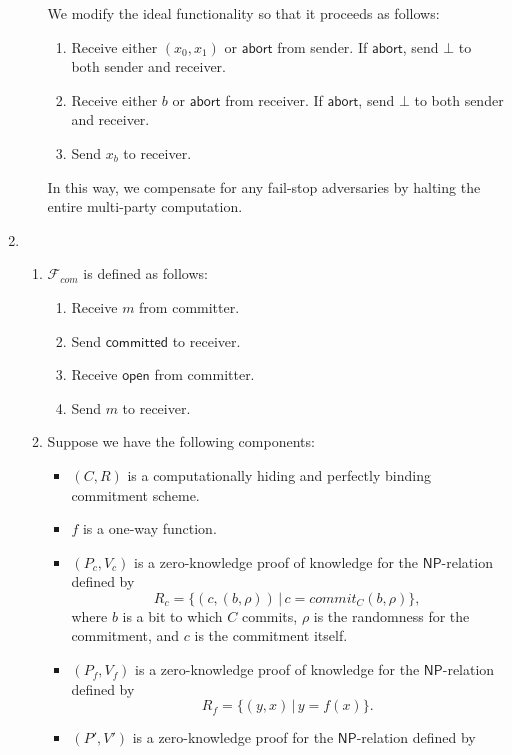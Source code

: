 \documentclass[draft]{article}
\newcommand{\class}[1]{{\ensuremath{\mathsf{#1}}}}
\newcommand{\NP}{\class{NP}}
\begin{document}
\begin{enumerate}
\begin{enumerate}
    We modify the ideal functionality so that it proceeds as follows:
    \begin{enumerate}
    \item
      Receive either $(x_0, x_1)$ or $\textsf{abort}$ from sender.
      If $\textsf{abort}$, send $\bot$ to both sender and receiver.
    \item
      Receive either $b$ or $\textsf{abort}$ from receiver.
      If $\textsf{abort}$, send $\bot$ to both sender and receiver.
    \item Send $x_b$ to receiver.
    \end{enumerate}
    In this way, we compensate for any fail-stop adversaries by halting the entire multi-party computation.
  \end{enumerate}
\item
  \begin{enumerate}
  \item $\mathcal{F}_{com}$ is defined as follows:
    \begin{enumerate}
    \item Receive $m$ from committer.
    \item Send $\textsf{committed}$ to receiver.
    \item Receive $\textsf{open}$ from committer.
    \item Send $m$ to receiver.
    \end{enumerate}
  \item
    Suppose we have the following components:
    \begin{itemize}
    \item $(C, R)$ is a computationally hiding and perfectly binding commitment scheme.
    \item $f$ is a one-way function.
    \item
      $(P_c, V_c)$ is a zero-knowledge proof of knowledge for the \NP-relation defined by
      \begin{displaymath}
        R_c=\{(c, (b, \rho)) \,|\, c=commit_C(b, \rho) \},
      \end{displaymath}
      where $b$ is a bit to which $C$ commits, $\rho$ is the randomness for the commitment, and $c$ is the commitment itself.
    \item $(P_f, V_f)$ is a zero-knowledge proof of knowledge for the \NP-relation defined by
      \begin{displaymath}
        R_f=\{(y, x)\,|\,y = f(x)\}.
      \end{displaymath}
    \item $(P', V')$ is a zero-knowledge proof for the \NP-relation defined by

\end{itemize}
\end{enumerate}
\end{enumerate}
\end{document}
